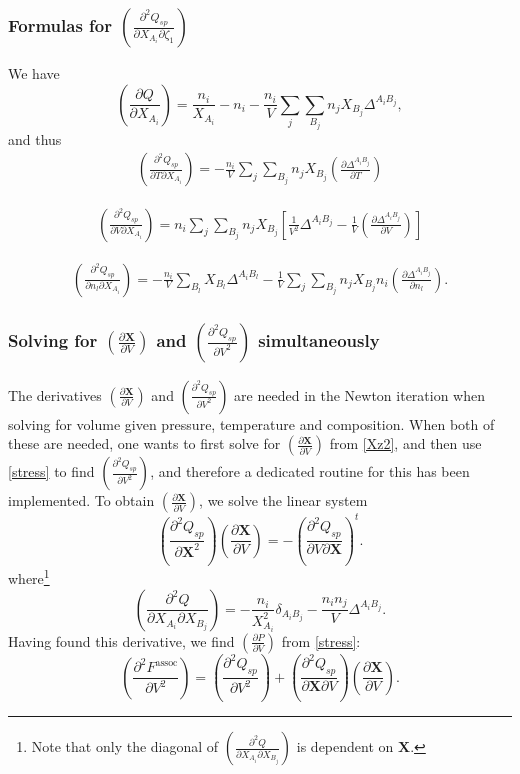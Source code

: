 \documentclass[english]{../thermomemo/thermomemo}
\newcommand{\mbf}[0]{\mathbf}
\newcommand*{\pder}[2]{\left(\frac{\partial #1}{\partial #2}\right)}
\newcommand*{\pdder}[2]{\left(\frac{\partial^2 #1}{\partial #2^2}\right)}
\newcommand*{\pdcross}[3]{\left(\frac{\partial^2 #1}{\partial #2 \partial #3}\right)}
\newcommand{\z}{\zeta}
\begin{document}
\subsubsection{Formulas for $\pdcross{Q_{sp}}{X_{A_i}}{\z_1}$}
We have
\begin{equation}
  \pder{Q}{X_{A_i}} = \frac{n_i}{X_{A_i}} - n_i  - \frac{n_i}{V} \sum_{j} \sum_{B_j} n_j X_{B_j} \Delta^{A_i B_j},
\end{equation}
and thus
\begin{align*}
  \pdcross{Q_{sp}}{T}{X_{A_i}} = -\frac{n_i}{V} \sum_{j} \sum_{B_j} n_j X_{B_j} \pder{\Delta^{A_i B_j}}{T}
\end{align*}

\begin{align*}
  \pdcross{Q_{sp}}{V}{X_{A_i}} = n_i \sum_{j} \sum_{B_j} n_j X_{B_j} \left[ \frac{1}{V^2} \Delta^{A_i B_j} - \frac{1}{V} \pder{\Delta^{A_i B_j}}{V} \right]
\end{align*}

\begin{align*}
  \pdcross{Q_{sp}}{n_l}{X_{A_i}} = - \frac{n_i}{V} \sum_{B_l} X_{B_l} \Delta^{A_i B_l} - \frac{1}{V} \sum_{j} \sum_{B_j} n_j X_{B_j} n_i \pder{\Delta^{A_i B_j}}{n_l}.
\end{align*}

\subsubsection{Solving for $\pder{\mbf X}{V}$ and $\pdder{Q_{sp}}{V}$ simultaneously}
The derivatives $\pder{\mbf X}{V}$ and $\pdder{Q_{sp}}{V}$ are needed in the
Newton iteration when solving for volume given pressure, temperature and
composition. When both of these are needed, one wants to first solve for
$\pder{\mbf X}{V}$ from \eqref{Xz2}, and then use \eqref{stress} to find
$\pdder{Q_{sp}}{V}$, and therefore a dedicated routine for this has been
implemented. To obtain $\pder{\mbf X}{V}$, we solve the linear system
\begin{equation}
  \pdder{Q_{sp}}{\mbf X} \pder{\mbf X}{V} = -\pdcross{Q_{sp}}{V}{\mbf X}^t.
\end{equation}
where\footnote{Note that only the diagonal of $\pdcross{Q}{X_{A_i}}{X_{B_j}}$ is dependent on $\mbf X$.}
\begin{equation}
  \pdcross{Q}{X_{A_i}}{X_{B_j}} = -\frac{n_i}{X_{A_i}^2} \delta_{A_i B_j} - \frac{n_i n_j}{V} \Delta^{A_i B_j}.
\end{equation}
Having found this derivative, we find $\pder{P}{V}$ from \eqref{stress}:
\begin{equation}
    \pdder{F^{\text{assoc}}}{V} = \pdder{Q_{sp}}{V} + \pdcross{Q_{sp}}{\mbf X}{V} \pder{\mbf X}{V}.
\end{equation}
\end{document}
